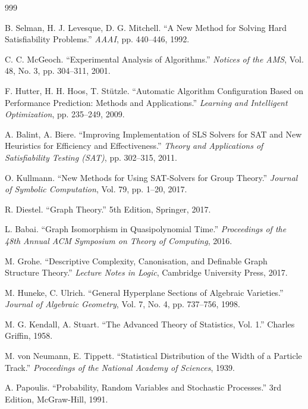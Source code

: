﻿\documentclass[a4paper,12pt]{article}
\theoremstyle{definition}
\begin{document}
\begin{thebibliography}{999}

 B. Selman, H. J. Levesque, D. G. Mitchell. ``A New Method for Solving Hard Satisfiability Problems.'' \textit{AAAI}, pp. 440--446, 1992.

 C. C. McGeoch. ``Experimental Analysis of Algorithms.'' \textit{Notices of the AMS}, Vol. 48, No. 3, pp. 304--311, 2001.

 F. Hutter, H. H. Hoos, T. Stützle. ``Automatic Algorithm Configuration Based on Performance Prediction: Methods and Applications.'' \textit{Learning and Intelligent Optimization}, pp. 235--249, 2009.

 A. Balint, A. Biere. ``Improving Implementation of SLS Solvers for SAT and New Heuristics for Efficiency and Effectiveness.'' \textit{Theory and Applications of Satisfiability Testing (SAT)}, pp. 302--315, 2011.

 O. Kullmann. ``New Methods for Using SAT-Solvers for Group Theory.'' \textit{Journal of Symbolic Computation}, Vol. 79, pp. 1--20, 2017.


 R. Diestel. ``Graph Theory.'' 5th Edition, Springer, 2017.

 L. Babai. ``Graph Isomorphism in Quasipolynomial Time.'' \textit{Proceedings of the 48th Annual ACM Symposium on Theory of Computing}, 2016.

 M. Grohe. ``Descriptive Complexity, Canonisation, and Definable Graph Structure Theory.'' \textit{Lecture Notes in Logic}, Cambridge University Press, 2017.

 M. Huneke, C. Ulrich. ``General Hyperplane Sections of Algebraic Varieties.'' \textit{Journal of Algebraic Geometry}, Vol. 7, No. 4, pp. 737--756, 1998.


 M. G. Kendall, A. Stuart. ``The Advanced Theory of Statistics, Vol. 1.'' Charles Griffin, 1958.

 M. von Neumann, E. Tippett. ``Statistical Distribution of the Width of a Particle Track.'' \textit{Proceedings of the National Academy of Sciences}, 1939.

 A. Papoulis. ``Probability, Random Variables and Stochastic Processes.'' 3rd Edition, McGraw-Hill, 1991.


\end{thebibliography}
\end{document}
